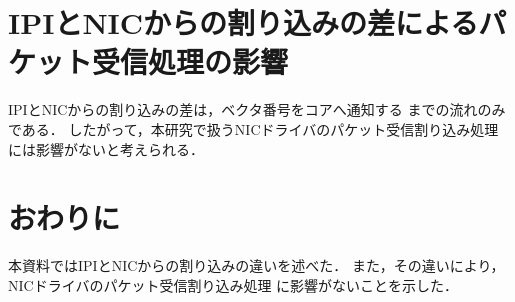 \documentclass[12pt]{jsarticle}
\begin{document}
\section{IPIとNICからの割り込みの差によるパケット受信処理の影響}
IPIとNICからの割り込みの差は，ベクタ番号をコアへ通知する
までの流れのみである．
したがって，本研究で扱うNICドライバのパケット受信割り込み処理
には影響がないと考えられる．
\section{おわりに}
本資料ではIPIとNICからの割り込みの違いを述べた．
また，その違いにより，NICドライバのパケット受信割り込み処理
に影響がないことを示した．
\end{document}
